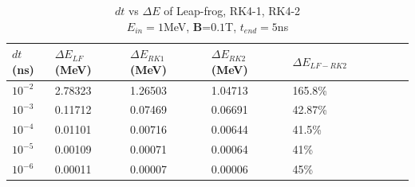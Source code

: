 \documentclass[a4paper,oneside,12pt]{report}
\numberwithin{equation}{chapter}
\begin{document}
\begin{table}[H]
    \centering
    \begin{tabular}{|l|l|l|l|l|l|l|l|l|l|}
    \hline
        $dt$(ns) & $\Delta E_{LF}$(MeV) & $\Delta E_{RK1}$(MeV)  & $\Delta E_{RK2}$(MeV)  & $\Delta E_{LF-RK2}$\\\hline
        $10^{-2}$ & 2.78323 & 1.26503 & 1.04713 & 165.8\% \\ \hline
        $10^{-3}$ & 0.11712 & 0.07469 & 0.06691 & 42.87\% \\ \hline
        $10^{-4}$ & 0.01101 & 0.00716 & 0.00644 & 41.5\%  \\ \hline
        $10^{-5}$ & 0.00109 & 0.00071 & 0.00064 & 41\% \\ \hline
        $10^{-6}$ & 0.00011 & 0.00007 & 0.00006 & 45\% \\\hline
    \end{tabular}
    \caption{$dt$ vs $\Delta E$ of Leap-frog, RK4-1, RK4-2 \\$E_{in}=1$MeV, \textbf{B}=$0.1$T, $t_{end}=5$ns}
    \label{tab:lf_rk1_rk2_dE}
\end{table}
\end{document}
